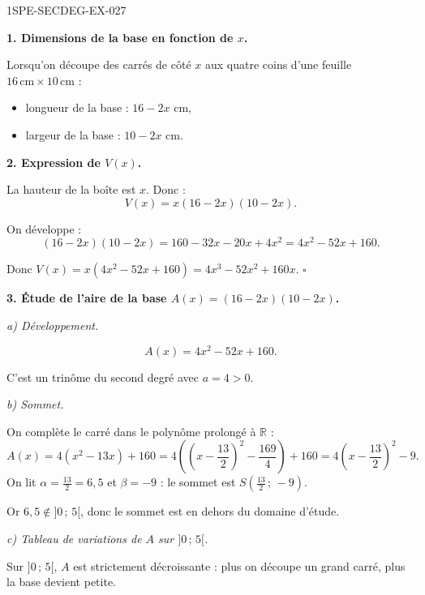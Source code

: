 \begin{corrige}{1SPE-SECDEG-EX-027}

\textbf{1. Dimensions de la base en fonction de $x$.}


Lorsqu'on découpe des carrés de côté $x$ aux quatre coins d'une feuille $16\,\text{cm} \times 10\,\text{cm}$ :
\begin{itemize}
  \item longueur de la base : $16 - 2x$ cm,
  \item largeur de la base : $10 - 2x$ cm.
\end{itemize}

\medskip
\textbf{2. Expression de $V(x)$.}


La hauteur de la boîte est $x$. Donc :
\[V(x) = x(16 - 2x)(10 - 2x).\]

On développe :
\[(16 - 2x)(10 - 2x) = 160 - 32x - 20x + 4x^2 = 4x^2 - 52x + 160.\]

Donc $V(x) = x(4x^2 - 52x + 160) = 4x^3 - 52x^2 + 160x$. \hfill $\square$

\medskip
\textbf{3. Étude de l'aire de la base $A(x) = (16-2x)(10-2x)$.}

\textit{a) Développement.}


\[A(x) = 4x^2 - 52x + 160.\]

C'est un trinôme du second degré avec $a = 4 > 0$.

\textit{b) Sommet.}

On complète le carré dans le polynôme prolongé à $\mathbb{R}$ :
\[A(x)=4(x^2-13x)+160
=4\left(\left(x-\frac{13}{2}\right)^2-\frac{169}{4}\right)+160
=4\left(x-\frac{13}{2}\right)^2-9.\]
On lit $\alpha=\frac{13}{2}=6{,}5$ et $\beta=-9$ : le sommet est $S\left(\frac{13}{2}\,;\,-9\right)$.

Or $6{,}5 \notin ]0\,;\,5[$, donc le sommet est en dehors du domaine d'étude.

\textit{c) Tableau de variations de $A$ sur $]0\,;\,5[$.}

\commentaireMarge{Comme $a > 0$ et le sommet est en $x = 6{,}5 > 5$, $A$ est décroissante sur $]0\,;\,5[$.}

Sur $]0\,;\,5[$, $A$ est strictement décroissante : plus on découpe un grand carré, plus la base devient petite.


\end{corrige}
